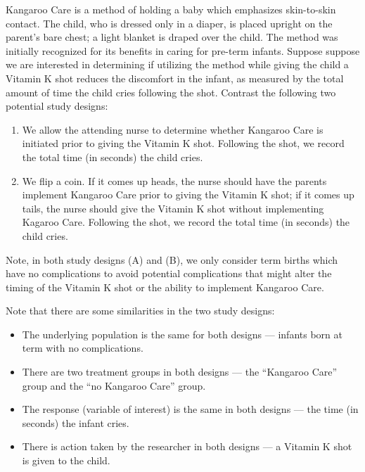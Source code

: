 \documentclass[]{book}
\providecommand{\tightlist}{%
  \setlength{\itemsep}{0pt}\setlength{\parskip}{0pt}}
\theoremstyle{definition}
\theoremstyle{definition}
\theoremstyle{remark}
\begin{document}
Kangaroo Care is a method of holding a baby which emphasizes
skin-to-skin contact. The child, who is dressed only in a diaper, is
placed upright on the parent's bare chest; a light blanket is draped
over the child. The method was initially recognized for its benefits in
caring for pre-term infants. Suppose suppose we are interested in
determining if utilizing the method while giving the child a Vitamin K
shot reduces the discomfort in the infant, as measured by the total
amount of time the child cries following the shot. Contrast the
following two potential study designs:

\begin{enumerate}
\def\labelenumi{(\Alph{enumi})}
\tightlist
\item
  We allow the attending nurse to determine whether Kangaroo Care is
  initiated prior to giving the Vitamin K shot. Following the shot, we
  record the total time (in seconds) the child cries.
\item
  We flip a coin. If it comes up heads, the nurse should have the
  parents implement Kangaroo Care prior to giving the Vitamin K shot; if
  it comes up tails, the nurse should give the Vitamin K shot without
  implementing Kagaroo Care. Following the shot, we record the total
  time (in seconds) the child cries.
\end{enumerate}

Note, in both study designs (A) and (B), we only consider term births
which have no complications to avoid potential complications that might
alter the timing of the Vitamin K shot or the ability to implement
Kangaroo Care.

Note that there are some similarities in the two study designs:

\begin{itemize}
\tightlist
\item
  The underlying population is the same for both designs --- infants
  born at term with no complications.
\item
  There are two treatment groups in both designs --- the ``Kangaroo
  Care'' group and the ``no Kangaroo Care'' group.
\item
  The response (variable of interest) is the same in both designs ---
  the time (in seconds) the infant cries.
\item
  There is action taken by the researcher in both designs --- a Vitamin
  K shot is given to the child.
\end{itemize}
\end{document}
